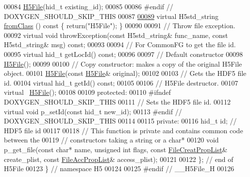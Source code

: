 \begin{DoxyCode}
00084         \hyperlink{class_h5_1_1_h5_file}{H5File}(hid\_t existing\_id);
00085 
00086 \textcolor{preprocessor}{#endif // DOXYGEN\_SHOULD\_SKIP\_THIS}
00087 
\hyperlink{class_h5_1_1_h5_file_ae3456c7a33bc2bcf0cdd782ad2641fff}{00089}         \textcolor{keyword}{virtual} H5std\_string \hyperlink{class_h5_1_1_h5_file_ae3456c7a33bc2bcf0cdd782ad2641fff}{fromClass} ()\textcolor{keyword}{ const }\{ \textcolor{keywordflow}{return}(\textcolor{stringliteral}{"H5File"}); \}
00090 
00091         \textcolor{comment}{// Throw file exception.}
00092         \textcolor{keyword}{virtual} \textcolor{keywordtype}{void} throwException(\textcolor{keyword}{const} H5std\_string& func\_name, \textcolor{keyword}{const} H5std\_string& msg) \textcolor{keyword}{const};
00093 
00094         \textcolor{comment}{// For CommonFG to get the file id.}
00095         \textcolor{keyword}{virtual} hid\_t getLocId() \textcolor{keyword}{const};
00096 
00097         \textcolor{comment}{// Default constructor}
00098         \hyperlink{class_h5_1_1_h5_file}{H5File}();
00099 
00100         \textcolor{comment}{// Copy constructor: makes a copy of the original H5File object.}
00101         \hyperlink{class_h5_1_1_h5_file}{H5File}(\textcolor{keyword}{const} \hyperlink{class_h5_1_1_h5_file}{H5File}& original);
00102 
00103         \textcolor{comment}{// Gets the HDF5 file id.}
00104         \textcolor{keyword}{virtual} hid\_t getId() \textcolor{keyword}{const};
00105 
00106         \textcolor{comment}{// H5File destructor.}
00107         \textcolor{keyword}{virtual} ~\hyperlink{class_h5_1_1_h5_file}{H5File}();
00108 
00109    \textcolor{keyword}{protected}:
00110 \textcolor{preprocessor}{#ifndef DOXYGEN\_SHOULD\_SKIP\_THIS}
00111         \textcolor{comment}{// Sets the HDF5 file id.}
00112         \textcolor{keyword}{virtual} \textcolor{keywordtype}{void} p\_setId(\textcolor{keyword}{const} hid\_t new\_id);
00113 \textcolor{preprocessor}{#endif // DOXYGEN\_SHOULD\_SKIP\_THIS}
00114 
00115    \textcolor{keyword}{private}:
00116         hid\_t id;  \textcolor{comment}{// HDF5 file id}
00117 
00118         \textcolor{comment}{// This function is private and contains common code between the}
00119         \textcolor{comment}{// constructors taking a string or a char*}
00120         \textcolor{keywordtype}{void} p\_get\_file(\textcolor{keyword}{const} \textcolor{keywordtype}{char}* name, \textcolor{keywordtype}{unsigned} \textcolor{keywordtype}{int} flags, \textcolor{keyword}{const} 
      \hyperlink{class_h5_1_1_file_creat_prop_list}{FileCreatPropList}& create\_plist, \textcolor{keyword}{const} \hyperlink{class_h5_1_1_file_acc_prop_list}{FileAccPropList}& access\_plist);
00121 
00122 \}; \textcolor{comment}{// end of H5File}
00123 \} \textcolor{comment}{// namespace H5}
00124 
00125 \textcolor{preprocessor}{#endif // \_\_H5File\_H}
00126 
\end{DoxyCode}
